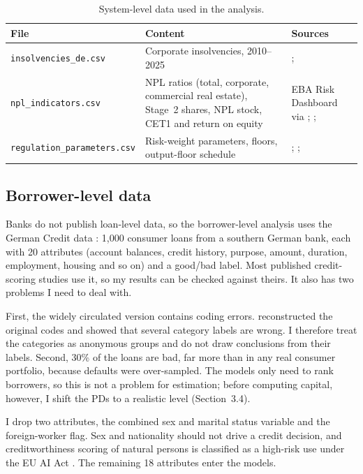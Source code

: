 \documentclass[11pt,a4paper]{article}
\begin{document}
\begin{table}[H]\centering\small
\caption{System-level data used in the analysis.}\label{tab:data}
\begin{tabular}{p{4.4cm}p{4.7cm}p{4.6cm}}
\toprule
File & Content & Sources \\
\midrule
\texttt{insolvencies\_de.csv} & Corporate insolvencies, 2010--2025 & \citet{destatis2023}; \citet{destatis2026} \\
\texttt{npl\_indicators.csv} & NPL ratios (total, corporate, commercial real estate), Stage~2 shares, NPL stock, CET1 and return on equity & EBA Risk Dashboard via \citet{bks2026a,bks2026b}; \citet{bafin2026}; \citet{ecb2026} \\
\texttt{regulation\_parameters.csv} & Risk-weight parameters, floors, output-floor schedule & \citet{crr}; \citet{crr3}; \citet{pwc_crr3} \\
\bottomrule
\end{tabular}
\end{table}

\subsection{Borrower-level data}
Banks do not publish loan-level data, so the borrower-level analysis uses the German Credit data \citep{hofmann1994}: 1,000 consumer loans from a southern German bank, each with 20 attributes (account balances, credit history, purpose, amount, duration, employment, housing and so on) and a good/bad label. Most published credit-scoring studies use it, so my results can be checked against theirs. It also has two problems I need to deal with.

First, the widely circulated version contains coding errors. \citet{groemping2019} reconstructed the original codes and showed that several category labels are wrong. I therefore treat the categories as anonymous groups and do not draw conclusions from their labels. Second, 30\% of the loans are bad, far more than in any real consumer portfolio, because defaults were over-sampled. The models only need to rank borrowers, so this is not a problem for estimation; before computing capital, however, I shift the PDs to a realistic level (Section~3.4).

I drop two attributes, the combined sex and marital status variable and the foreign-worker flag. Sex and nationality should not drive a credit decision, and creditworthiness scoring of natural persons is classified as a high-risk use under the EU AI Act \citep{aiact}. The remaining 18 attributes enter the models.
\end{document}
